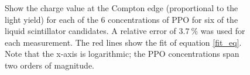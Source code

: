 \documentclass{JINST}
\begin{document}
\begin{figure}[tbh]
\begin{center}
\caption[]{Show the charge value at the Compton edge (proportional to the light yield) for each of the 6 concentrations of PPO for six of the liquid scintillator candidates. A relative error of $3.7~\%$ was used for each measurement. The red lines show the fit of equation \ref{fit_eq}. Note that the x-axis is logarithmic; the PPO concentrations span two orders of magnitude. %
  \label{ChargeResults_fig}}
        \end{center}
\end{figure}
\end{document}

